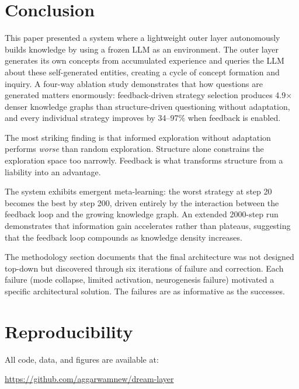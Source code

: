 \documentclass[conference]{IEEEtran}
\begin{document}
\section{Conclusion}
\label{sec:conclusion}

This paper presented a system where a lightweight outer layer autonomously builds knowledge by using a frozen LLM as an environment. The outer layer generates its own concepts from accumulated experience and queries the LLM about these self-generated entities, creating a cycle of concept formation and inquiry. A four-way ablation study demonstrates that how questions are generated matters enormously: feedback-driven strategy selection produces 4.9$\times$ denser knowledge graphs than structure-driven questioning without adaptation, and every individual strategy improves by 34--97\% when feedback is enabled.

The most striking finding is that informed exploration without adaptation performs \emph{worse} than random exploration. Structure alone constrains the exploration space too narrowly. Feedback is what transforms structure from a liability into an advantage.

The system exhibits emergent meta-learning: the worst strategy at step 20 becomes the best by step 200, driven entirely by the interaction between the feedback loop and the growing knowledge graph. An extended 2000-step run demonstrates that information gain accelerates rather than plateaus, suggesting that the feedback loop compounds as knowledge density increases.

The methodology section documents that the final architecture was not designed top-down but discovered through six iterations of failure and correction. Each failure (mode collapse, limited activation, neurogenesis failure) motivated a specific architectural solution. The failures are as informative as the successes.


\section*{Reproducibility}

All code, data, and figures are available at:

\begin{center}
\url{https://github.com/aggarwamnew/dream-layer}
\end{center}
\end{document}
